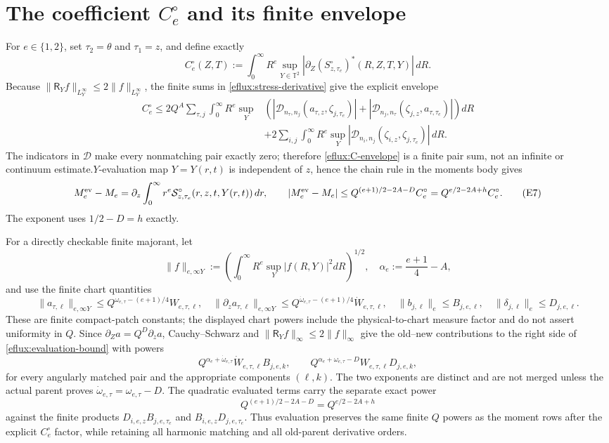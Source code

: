 \documentclass[11pt]{article}
\begin{document}
\section{The coefficient $C_e^\circ$ and its finite envelope}
For $e\in\{1,2\}$, set $\tau_2=\theta$ and $\tau_1=z$, and define exactly
\[
 C_e^\circ(Z,T):=\int_0^\infty R^e\sup_{Y\in\mathbb T^2}
 \left|\partial_Z(S^\circ_{z,\tau_e})^*(R,Z,T,Y)\right|\,dR.
 \tag{E6}\label{eflux:C}
\]
Because $\|\mathsf R_Yf\|_{L^\infty_Y}\le2\|f\|_{L^\infty_Y}$, the finite sums in \eqref{eflux:stress-derivative} give the explicit envelope
\begin{align}
 C_e^\circ\le 2Q^A\sum_{\tau,j}\int_0^\infty R^e\sup_Y &\left(
 |\mathcal D_{n_\tau,n_j}(a_{\tau,z},\zeta_{j,\tau_e})|
 +|\mathcal D_{n_j,n_\tau}(\zeta_{j,z},a_{\tau,\tau_e})|\right)dR
 \nonumber\\
 &+2\sum_{i,j}\int_0^\infty R^e\sup_Y
 |\mathcal D_{n_i,n_j}(\zeta_{i,z},\zeta_{j,\tau_e})|\,dR .
 \tag{E6a}\label{eflux:C-envelope}
\end{align}
The indicators in $\mathcal D$ make every nonmatching pair exactly zero;
therefore \eqref{eflux:C-envelope} is a finite pair sum, not an infinite
or continuum estimate.\nThe $Y$-evaluation map $Y=Y(r,t)$ is independent of $z$, hence the chain
rule in the moments body gives
\[
 M_e^{\rm ev}-M_e
 =\partial_z\int_0^\infty r^e\mathcal S^\circ_{z,\tau_e}(r,z,t,Y(r,t))\,dr,
 \qquad
 |M_e^{\rm ev}-M_e|\le
 Q^{(e+1)/2-2A-D}C_e^\circ
 =Q^{e/2-2A+h}C_e^\circ.
 \tag{E7}\label{eflux:evaluation-bound}
\]
The exponent uses $1/2-D=h$ exactly.

For a directly checkable finite majorant, let
\[
 \|f\|_{e,\infty Y}:=\left(\int_0^\infty R^e\sup_Y|f(R,Y)|^2dR\right)^{1/2},
 \quad \alpha_e:=\frac{e+1}{4}-A,
\]
and use the finite chart quantities
\[
 \|a_{\tau,\ell}\|_{e,\infty Y}\le Q^{\omega_{e,\tau}-(e+1)/4}W_{e,\tau,\ell},\quad
 \|\partial_za_{\tau,\ell}\|_{e,\infty Y}\le Q^{\dot\omega_{e,\tau}-(e+1)/4}\dot W_{e,\tau,\ell},
 \quad
 \|b_{j,\ell}\|_e\le B_{j,e,\ell},\quad
 \|\delta_{j,\ell}\|_e\le D_{j,e,\ell}.
 \tag{E8}\label{eflux:orders}
\]
These are finite compact-patch constants; the displayed chart powers include the physical-to-chart measure factor and do not assert uniformity in $Q$.
Since $\partial_Za=Q^D\partial_za$, Cauchy--Schwarz and $\|\mathsf R_Yf\|_\infty\le2\|f\|_\infty$
give the old--new contributions to the right side of \eqref{eflux:evaluation-bound}
with powers
\[
 Q^{\alpha_e+\dot\omega_{e,\tau}}\dot W_{e,\tau,\ell}B_{j,e,k},
 \qquad
 Q^{\alpha_e+\omega_{e,\tau}-D}W_{e,\tau,\ell}D_{j,e,k},
 \tag{E9}\label{eflux:old-orders}
\]
for every angularly matched pair and the appropriate components $(\ell,k)$.
The two exponents are distinct and are not merged unless the actual parent
proves $\dot\omega_{e,\tau}=\omega_{e,\tau}-D$.  The quadratic evaluated terms
carry the separate exact power
\[
 Q^{(e+1)/2-2A-D}=Q^{e/2-2A+h}
\tag{E10}\label{eflux:quad-order}
\]
against the finite products $D_{i,e,z}B_{j,e,\tau_e}$ and
$B_{i,e,z}D_{j,e,\tau_e}$.  Thus evaluation preserves the same finite
$Q$ powers as the moment rows after the explicit $C_e^\circ$ factor, while
retaining all harmonic matching and all old-parent derivative orders.
\end{document}
